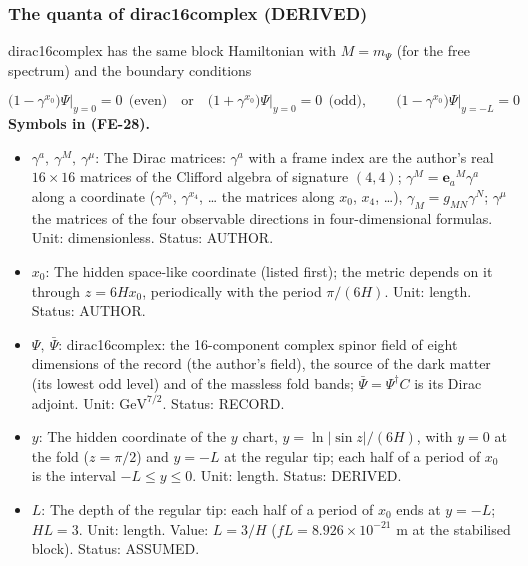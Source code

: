 \documentclass[
  10pt,
]{article}
\providecommand{\tightlist}{%
  \setlength{\itemsep}{0pt}\setlength{\parskip}{0pt}}
\begin{document}
\hypertarget{the-quanta-of-dirac16complex-derived}{%
\subsubsection*{The quanta of dirac16complex
(DERIVED)}\label{the-quanta-of-dirac16complex-derived}}

dirac16complex has the same block Hamiltonian with \(M = m_\Psi\) (for
the free spectrum) and the boundary conditions

\[
\big(1 - \gamma^{x_0}\big)\Psi\big\vert_{y=0} = 0\ \ \text{(even)}\quad\text{or}\quad
\big(1 + \gamma^{x_0}\big)\Psi\big\vert_{y=0} = 0\ \ \text{(odd)},\qquad
\big(1 - \gamma^{x_0}\big)\Psi\big\vert_{y=-L} = 0 \tag{FE-28}
\] \textbf{Symbols in (FE-28).}

\begin{itemize}
\tightlist
\item
  \(\gamma^a,\ \gamma^M,\ \gamma^\mu\): The Dirac matrices: \(\gamma^a\)
  with a frame index are the author's real \(16 \times 16\) matrices of
  the Clifford algebra of signature \((4, 4)\);
  \(\gamma^M = \mathbf{e}_a{}^M\gamma^a\) along a coordinate
  (\(\gamma^{x_0}\), \(\gamma^{x_4}\), \ldots{} the matrices along
  \(x_0\), \(x_4\), \ldots), \(\gamma_M = g_{MN}\gamma^N\);
  \(\gamma^\mu\) the matrices of the four observable directions in
  four-dimensional formulas. Unit: dimensionless. Status: AUTHOR.
\item
  \(x_0\): The hidden space-like coordinate (listed first); the metric
  depends on it through \(z = 6Hx_0\), periodically with the period
  \(\pi/(6H)\). Unit: length. Status: AUTHOR.
\item
  \(\Psi,\ \bar\Psi\): dirac16complex: the 16-component complex spinor
  field of eight dimensions of the record (the author's field), the
  source of the dark matter (its lowest odd level) and of the massless
  fold bands; \(\bar\Psi = \Psi^\dagger C\) is its Dirac adjoint. Unit:
  \(\mathrm{GeV}^{7/2}\). Status: RECORD.
\item
  \(y\): The hidden coordinate of the \(y\) chart,
  \(y = \ln\lvert\sin z\rvert/(6H)\), with \(y = 0\) at the fold
  (\(z = \pi/2\)) and \(y = -L\) at the regular tip; each half of a
  period of \(x_0\) is the interval \(-L \le y \le 0\). Unit: length.
  Status: DERIVED.
\item
  \(L\): The depth of the regular tip: each half of a period of \(x_0\)
  ends at \(y = -L\); \(HL = 3\). Unit: length. Value: \(L = 3/H\)
  (\(fL = 8.926\times10^{-21}\) m at the stabilised block). Status:
  ASSUMED.
\end{itemize}
\end{document}
